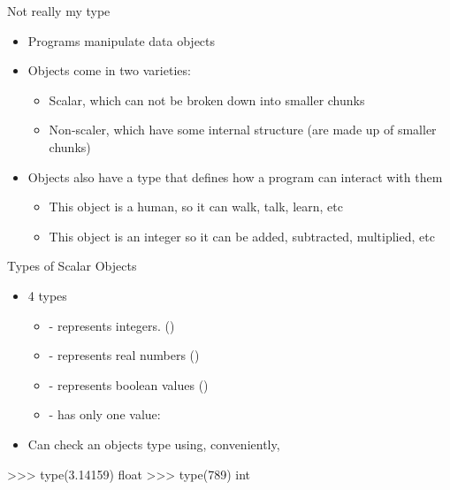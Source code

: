\documentclass[pdf, aspectratio=169, 12pt]{beamer}
\begin{document}
\begin{frame}{Not really my type}
	\begin{itemize}
		\item Programs manipulate \alert{data objects}
		\item Objects come in two varieties:
			\begin{itemize}
				\item Scalar, which can not be broken down into smaller chunks
				\item Non-scaler, which have some internal structure (are made up of smaller chunks)
			\end{itemize}
		\item Objects also have a \alert{type} that defines how a program can interact with them
			\begin{itemize}
				\item This object is a human, so it can walk, talk, learn, etc
				\item This object is an integer so it can be added, subtracted, multiplied, etc
			\end{itemize}
	\end{itemize}
\end{frame}

\begin{frame}[fragile]{Types of Scalar Objects}
	\begin{itemize}
		\item 4 types
		\begin{itemize}
			\item {} - represents integers. ()
			\item {} - represents real numbers ()
			\item {} - represents boolean values ()
			\item {} - has only one value: 
		\end{itemize}
		\item Can check an objects type using, conveniently, 
	\end{itemize}
	\pause
	\begin{pythoncode}
		>>> type(3.14159)
		float
		>>> type(789)
		int
	\end{pythoncode}
\end{frame}
\end{document}
